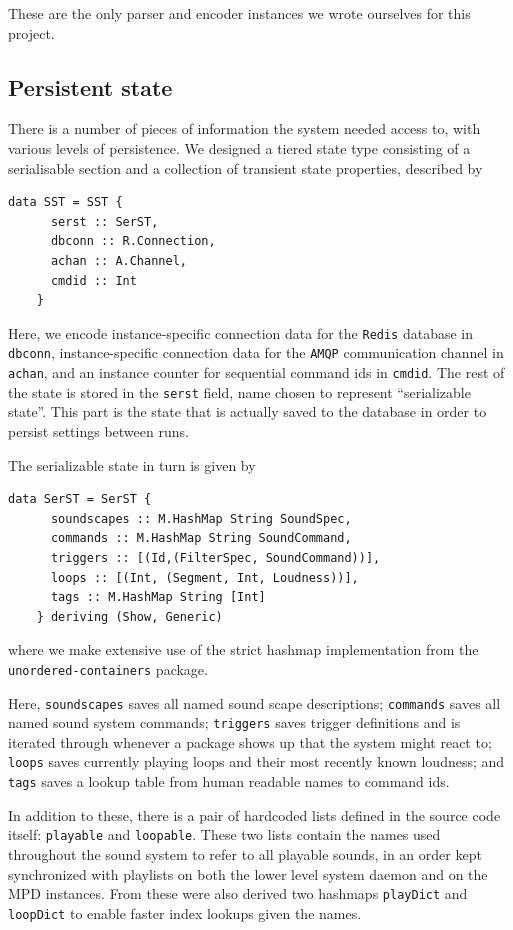 These are the only parser and encoder instances we wrote ourselves for
this project.


\subsection{Persistent state}
\label{sec:persistent-state}

There is a number of pieces of information the system needed access
to, with various levels of persistence. We designed a tiered state
type consisting of a serialisable section and a collection of
transient state properties, described by
\begin{verbatim}
data SST = SST {
      serst :: SerST,
      dbconn :: R.Connection,
      achan :: A.Channel,
      cmdid :: Int
    } 
\end{verbatim}
Here, we encode instance-specific connection data for the \texttt{Redis} database in
\texttt{dbconn}, instance-specific connection data for the \texttt{AMQP}
communication channel in \texttt{achan}, and an instance counter for
sequential command ids in \texttt{cmdid}. The rest of the state is
stored in the \texttt{serst} field, name chosen to represent
``serializable state''. This part is the state that is actually saved
to the database in order to persist settings between runs.

The serializable state in turn is given by
\begin{verbatim}
data SerST = SerST {
      soundscapes :: M.HashMap String SoundSpec,
      commands :: M.HashMap String SoundCommand,
      triggers :: [(Id,(FilterSpec, SoundCommand))],
      loops :: [(Int, (Segment, Int, Loudness))],
      tags :: M.HashMap String [Int]
    } deriving (Show, Generic)
\end{verbatim}
where we make extensive use of the strict hashmap implementation from
the \texttt{unordered-containers} package.

Here, \texttt{soundscapes} saves all named sound scape descriptions;
\texttt{commands} saves all named sound system commands;
\texttt{triggers} saves trigger definitions and is iterated through
whenever a package shows up that the system might react to;
\texttt{loops} saves currently playing loops and their most recently
known loudness; and \texttt{tags} saves a lookup table from human
readable names to command ids.

In addition to these, there is a pair of hardcoded lists defined in
the source code itself: \texttt{playable} and \texttt{loopable}.
These two lists contain the names used throughout the sound system to
refer to all playable sounds, in an order kept synchronized with
playlists on both the lower level system daemon and on the MPD
instances. From these were also derived two hashmaps \texttt{playDict} and \texttt{loopDict} to enable
faster index lookups given the names.


